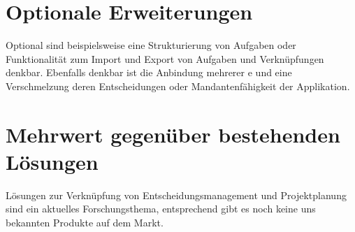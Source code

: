 	
	\section{Optionale Erweiterungen}
	Optional sind beispielsweise eine Strukturierung von Aufgaben oder Funktionalität zum Import und Export von Aufgaben und Verknüpfungen denkbar.	
	Ebenfalls denkbar ist die Anbindung mehrerer \dks e und eine Verschmelzung deren Entscheidungen oder Mandantenfähigkeit der Applikation.
	
	
	\section{Mehrwert gegenüber bestehenden Lösungen}
	Lösungen zur Verknüpfung von Entscheidungsmanagement und Projektplanung sind ein aktuelles Forschungsthema, 
	entsprechend gibt es noch keine uns bekannten Produkte auf dem Markt.
	 		
		
	